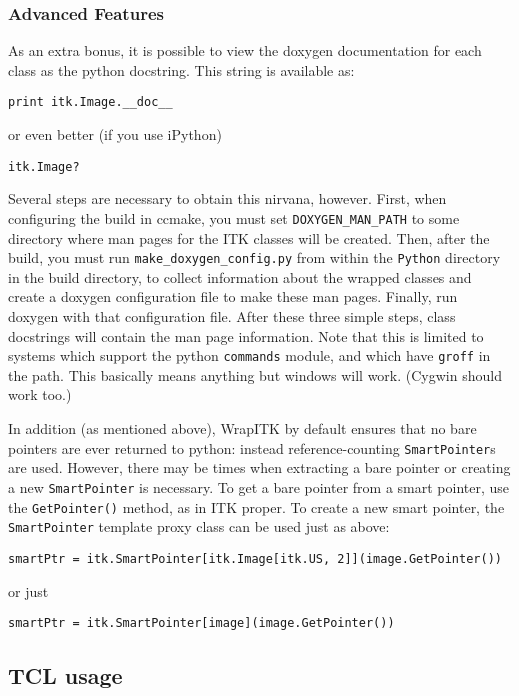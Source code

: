 \documentclass{InsightArticle}
\begin{document}
     \subsubsection{Advanced Features}

As an extra bonus, it is possible to view the doxygen documentation for each
class as the python docstring. This string is available as:
\small \begin{verbatim}
print itk.Image.__doc__
\end{verbatim} \normalsize
or even better (if you use iPython)
\small \begin{verbatim}
itk.Image?
\end{verbatim} \normalsize

Several steps are necessary to obtain this nirvana, however. First, when
configuring the build in ccmake, you must set \verb$DOXYGEN_MAN_PATH$ to some directory
where man pages for the ITK classes will be created. Then, after the build, you
must run \verb$make_doxygen_config.py$ from within the \verb$Python$ directory in the build
directory, to collect information about the wrapped classes and create a doxygen
configuration file to make these man pages. Finally, run doxygen with that
configuration file. After these three simple steps, class docstrings will
contain the man page information. Note that this is limited to systems which
support the python \verb$commands$ module, and which have \verb$groff$ in the path. This
basically means anything but windows will work. (Cygwin should work too.)

In addition (as mentioned above), WrapITK by default ensures that no bare
pointers are ever returned to python: instead reference-counting \verb$SmartPointer$s
are used. However, there may be times when extracting a bare pointer or creating
a new \verb$SmartPointer$ is necessary. To get a bare pointer from a smart pointer, use
the \verb$GetPointer()$ method, as in ITK proper. To create a new smart pointer, the
\verb$SmartPointer$ template proxy class can be used just as above:
\small \begin{verbatim}
smartPtr = itk.SmartPointer[itk.Image[itk.US, 2]](image.GetPointer())
\end{verbatim} \normalsize
or just
\small \begin{verbatim}
smartPtr = itk.SmartPointer[image](image.GetPointer())
\end{verbatim} \normalsize

    \subsection{TCL usage}
\end{document}

